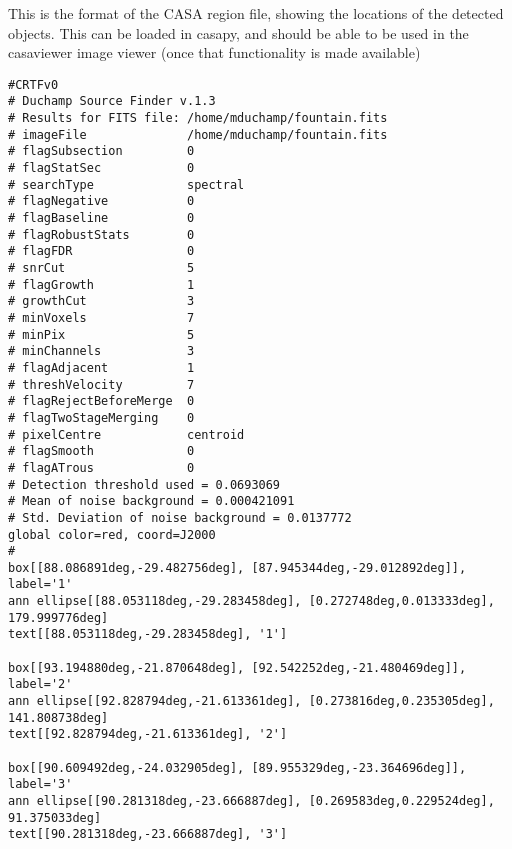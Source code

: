 %
%
%
%
\label{app-casa}

This is the format of the CASA region file, showing the locations
of the detected objects. This can be loaded in casapy, and should be
able to be used in the casaviewer image viewer (once that
functionality is made available)

\begin{verbatim}
#CRTFv0
# Duchamp Source Finder v.1.3
# Results for FITS file: /home/mduchamp/fountain.fits
# imageFile              /home/mduchamp/fountain.fits
# flagSubsection         0
# flagStatSec            0
# searchType             spectral
# flagNegative           0
# flagBaseline           0
# flagRobustStats        0
# flagFDR                0
# snrCut                 5
# flagGrowth             1
# growthCut              3
# minVoxels              7
# minPix                 5
# minChannels            3
# flagAdjacent           1
# threshVelocity         7
# flagRejectBeforeMerge  0
# flagTwoStageMerging    0
# pixelCentre            centroid
# flagSmooth             0
# flagATrous             0
# Detection threshold used = 0.0693069
# Mean of noise background = 0.000421091
# Std. Deviation of noise background = 0.0137772
global color=red, coord=J2000 
#
box[[88.086891deg,-29.482756deg], [87.945344deg,-29.012892deg]], label='1'
ann ellipse[[88.053118deg,-29.283458deg], [0.272748deg,0.013333deg], 179.999776deg]
text[[88.053118deg,-29.283458deg], '1']

box[[93.194880deg,-21.870648deg], [92.542252deg,-21.480469deg]], label='2'
ann ellipse[[92.828794deg,-21.613361deg], [0.273816deg,0.235305deg], 141.808738deg]
text[[92.828794deg,-21.613361deg], '2']

box[[90.609492deg,-24.032905deg], [89.955329deg,-23.364696deg]], label='3'
ann ellipse[[90.281318deg,-23.666887deg], [0.269583deg,0.229524deg], 91.375033deg]
text[[90.281318deg,-23.666887deg], '3']
\end{verbatim}
